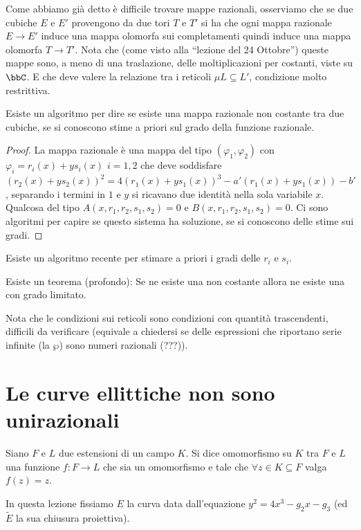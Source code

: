 Come abbiamo già detto è difficile trovare mappe razionali, osserviamo che se due cubiche $E$ e $E'$ provengono da due tori $T$ e $T'$ si ha che ogni mappa razionale $E\rightarrow E'$ induce una mappa olomorfa sui completamenti quindi induce una mappa olomorfa $T\rightarrow T'$. Nota che (come visto alla ``lezione del 24 Ottobre'') queste mappe sono, a meno di una traslazione, delle moltiplicazioni per costanti, viste su $\bbC$. E che deve valere la relazione tra i reticoli $\mu L\subseteq L'$, condizione molto restrittiva.

\begin{proposizione}
Esiste un algoritmo per dire se esiste una mappa razionale non costante tra due cubiche, se si conoscono stime a priori sul grado della funzione razionale.
\end{proposizione}

\begin{proof} La mappa razionale è una mappa del tipo $(\varphi_1,\varphi_2)$ con $\varphi_i=r_i(x)+y s_i(x)$ $i=1,2$  che deve soddisfare $(r_2(x)+y s_2(x))^2=4(r_1(x)+y s_1(x))^3-a'(r_1(x)+y s_1(x))-b'$, separando i termini in $1$ e $y$ si ricavano due identità nella sola variabile $x$. Qualcosa del tipo $A(x,r_1,r_2,s_1,s_2)=0$ e $B(x,r_1,r_2,s_1,s_2)=0$. Ci sono algoritmi per capire se questo sistema ha soluzione, se si conoscono delle stime sui gradi.
\end{proof}

\begin{osservazione} Esiste un algoritmo recente per stimare a priori i gradi delle $r_i$ e $s_i$.

Esiste un teorema (profondo): Se ne esiste una non costante allora ne esiste una con grado limitato.

Nota che le condizioni sui reticoli sono condizioni con quantità trascendenti, difficili da verificare (equivale a chiedersi se delle espressioni che riportano serie infinite (la $\wp$) sono numeri razionali (???)).
\end{osservazione}


\section{Le curve ellittiche non sono unirazionali}

\begin{definizione}
Siano $F$ e $L$ due estensioni di un campo $K$. Si dice omomorfismo su $K$ tra $F$ e $L$ una funzione $f:F\rightarrow L$ che sia un omomorfismo e tale che $\forall z\in K\subseteq F$ valga $f(z)=z$.
\end{definizione}
In questa lezione fissiamo $E$ la curva data dall'equazione $y^2=4x^3-g_2x-g_3$ (ed $\widetilde{E}$ la sua chiusura proiettiva).

